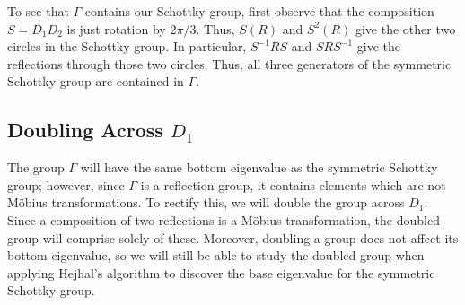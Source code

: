\documentclass[]{article}
\begin{document}
To see that $\Gamma$ contains our Schottky group, first observe that the composition $S = D_1D_2$ is just rotation by $2\pi/3$.
Thus, $S(R)$ and $S^2(R)$ give the other two circles in the Schottky group.
In particular, $S^{-1}RS$ and $SRS^{-1}$ give the reflections through those two circles.
Thus, all three generators of the symmetric Schottky group are contained in $\Gamma$.

\subsection*{Doubling Across $D_1$}

The group $\Gamma$ will have the same bottom eigenvalue as the symmetric Schottky group; however, since $\Gamma$ is a reflection group, it contains elements which are not M\"obius transformations.
To rectify this, we will double the group across $D_1$.
Since a composition of two reflections is a M\"obius transformation, the doubled group will comprise solely of these.
Moreover, doubling a group does not affect its bottom eigenvalue, so we will still be able to study the doubled group when applying Hejhal's algorithm to discover the base eigenvalue for the symmetric Schottky group.
\end{document}
